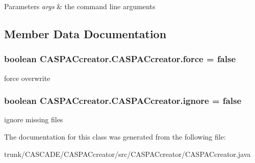\begin{DoxyParams}{Parameters}
{\em args} & the command line arguments \\
\hline
\end{DoxyParams}


\subsection{Member Data Documentation}
\hypertarget{classCASPACcreator_1_1CASPACcreator_a06739ae603ad3ff397ecf3efb8d2ced5}{
\subsubsection[{force}]{\setlength{\rightskip}{0pt plus 5cm}boolean C\-A\-S\-P\-A\-Ccreator.\-C\-A\-S\-P\-A\-Ccreator.\-force = false}}\label{classCASPACcreator_1_1CASPACcreator_a06739ae603ad3ff397ecf3efb8d2ced5}
force overwrite \hypertarget{classCASPACcreator_1_1CASPACcreator_af131ba1e4eed877fa18018c5b7304255}{
\subsubsection[{ignore}]{\setlength{\rightskip}{0pt plus 5cm}boolean C\-A\-S\-P\-A\-Ccreator.\-C\-A\-S\-P\-A\-Ccreator.\-ignore = false}}\label{classCASPACcreator_1_1CASPACcreator_af131ba1e4eed877fa18018c5b7304255}
ignore missing files 

The documentation for this class was generated from the following file\-:\begin{DoxyCompactItemize}
\item 
trunk/\-C\-A\-S\-C\-A\-D\-E/\-C\-A\-S\-P\-A\-Ccreator/src/\-C\-A\-S\-P\-A\-Ccreator/C\-A\-S\-P\-A\-Ccreator.\-java\end{DoxyCompactItemize}
